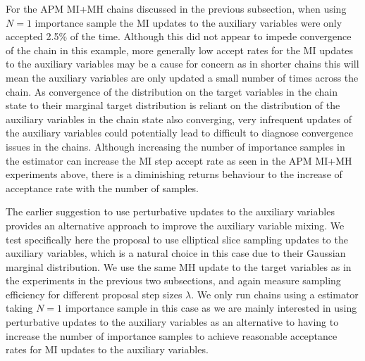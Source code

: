 For the \ac{APM} \ac{MI}+\ac{MH} chains discussed in the previous subsection, when using $N=1$ importance sample the \ac{MI} updates to the auxiliary variables were only accepted 2.5\% of the time. Although this did not appear to impede convergence of the chain in this example, more generally low accept rates for the \ac{MI} updates to the auxiliary variables may be a cause for concern as in shorter chains this will mean the auxiliary variables are only updated a small number of times across the chain. As convergence of the distribution on the target variables in the chain state to their marginal target distribution is reliant on the distribution of the auxiliary variables in the chain state also converging, very infrequent updates of the auxiliary variables could potentially lead to difficult to diagnose convergence issues in the chains. Although increasing the number of importance samples in the estimator can increase the \ac{MI} step accept rate as seen in the \ac{APM} \ac{MI}+\ac{MH} experiments above, there is a diminishing returns behaviour to the increase of acceptance rate with the number of samples.%

The earlier suggestion to use perturbative updates to the auxiliary variables provides an alternative approach to improve the auxiliary variable mixing. We test specifically here the proposal to use elliptical slice sampling updates to the auxiliary variables, which is a natural choice in this case due to their Gaussian marginal distribution. We use the same \ac{MH} update to the target variables as in the experiments in the previous two subsections, and again measure sampling efficiency for different proposal step sizes $\lambda$. We only run chains using a estimator taking $N=1$ importance sample in this case as we are mainly interested in using perturbative updates to the auxiliary variables as an alternative to having to increase the number of importance samples to achieve reasonable acceptance rates for \ac{MI} updates to the auxiliary variables.

